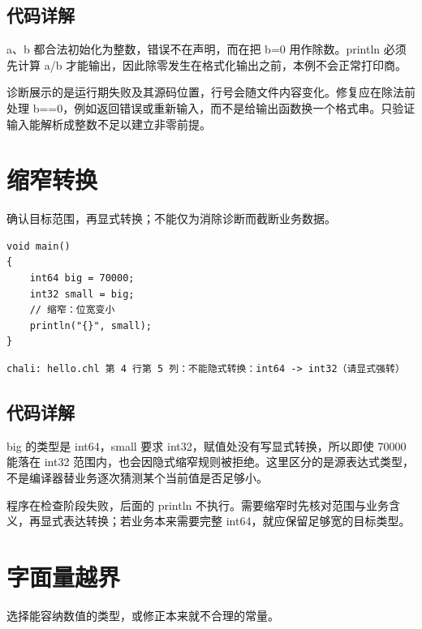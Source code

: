 \subsection*{代码详解}

a、b 都合法初始化为整数，错误不在声明，而在把 b=0 用作除数。println 必须先计算 a/b 才能输出，因此除零发生在格式化输出之前，本例不会正常打印商。

诊断展示的是运行期失败及其源码位置，行号会随文件内容变化。修复应在除法前处理 b==0，例如返回错误或重新输入，而不是给输出函数换一个格式串。只验证输入能解析成整数不足以建立非零前提。

\section{缩窄转换}

确认目标范围，再显式转换；不能仅为消除诊断而截断业务数据。

\par
\medskip
\begin{lstlisting}[style=chali]
void main()
{
    int64 big = 70000;
    int32 small = big;
    // 缩窄：位宽变小
    println("{}", small);
}
\end{lstlisting}
\par
\medskip

\par
\medskip
\begin{lstlisting}[style=out]
chali: hello.chl 第 4 行第 5 列：不能隐式转换：int64 -> int32（请显式强转）
\end{lstlisting}
\par
\medskip

\subsection*{代码详解}

big 的类型是 int64，small 要求 int32，赋值处没有写显式转换，所以即使 70000 能落在 int32 范围内，也会因隐式缩窄规则被拒绝。这里区分的是源表达式类型，不是编译器替业务逐次猜测某个当前值是否足够小。

程序在检查阶段失败，后面的 println 不执行。需要缩窄时先核对范围与业务含义，再显式表达转换；若业务本来需要完整 int64，就应保留足够宽的目标类型。

\section{字面量越界}

选择能容纳数值的类型，或修正本来就不合理的常量。

